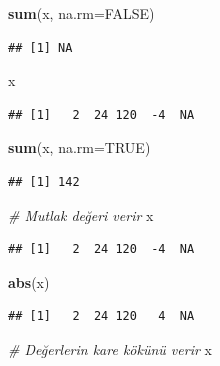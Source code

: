 \documentclass[
]{book}
\newenvironment{Shaded}{\begin{snugshade}}{\end{snugshade}}
\newcommand{\AttributeTok}[1]{\textcolor[rgb]{0.13,0.29,0.53}{#1}}
\newcommand{\CommentTok}[1]{\textcolor[rgb]{0.56,0.35,0.01}{\textit{#1}}}
\newcommand{\ConstantTok}[1]{\textcolor[rgb]{0.56,0.35,0.01}{#1}}
\newcommand{\FunctionTok}[1]{\textcolor[rgb]{0.13,0.29,0.53}{\textbf{#1}}}
\newcommand{\NormalTok}[1]{#1}
\begin{document}
\begin{Shaded}
\begin{Highlighting}[]
\FunctionTok{sum}\NormalTok{(x, }\AttributeTok{na.rm=}\ConstantTok{FALSE}\NormalTok{)}
\end{Highlighting}
\end{Shaded}

\begin{verbatim}
## [1] NA
\end{verbatim}

\begin{Shaded}
\begin{Highlighting}[]
\NormalTok{x}
\end{Highlighting}
\end{Shaded}

\begin{verbatim}
## [1]   2  24 120  -4  NA
\end{verbatim}

\begin{Shaded}
\begin{Highlighting}[]
\FunctionTok{sum}\NormalTok{(x, }\AttributeTok{na.rm=}\ConstantTok{TRUE}\NormalTok{)}
\end{Highlighting}
\end{Shaded}

\begin{verbatim}
## [1] 142
\end{verbatim}

\begin{Shaded}
\begin{Highlighting}[]
\CommentTok{\# Mutlak değeri verir}
\NormalTok{x}
\end{Highlighting}
\end{Shaded}

\begin{verbatim}
## [1]   2  24 120  -4  NA
\end{verbatim}

\begin{Shaded}
\begin{Highlighting}[]
\FunctionTok{abs}\NormalTok{(x)}
\end{Highlighting}
\end{Shaded}

\begin{verbatim}
## [1]   2  24 120   4  NA
\end{verbatim}

\begin{Shaded}
\begin{Highlighting}[]
\CommentTok{\# Değerlerin kare kökünü verir}
\NormalTok{x}
\end{Highlighting}
\end{Shaded}
\end{document}
